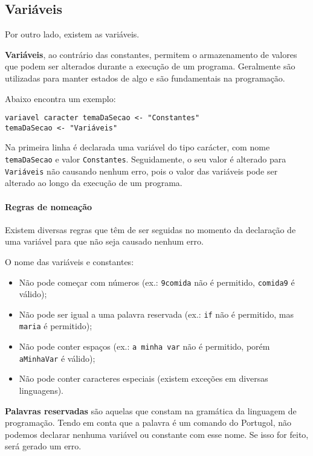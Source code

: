 \subsection{Variáveis}

Por outro lado, existem as variáveis.

\begin{defi}
\textbf{Variáveis}, ao contrário das constantes, permitem o armazenamento de valores que podem ser alterados durante a execução de um programa. Geralmente são utilizadas para manter estados de algo e são fundamentais na programação.
\end{defi}

Abaixo encontra um exemplo:

\begin{lstlisting}
variavel caracter temaDaSecao <- "Constantes"      
temaDaSecao <- "Variáveis"  
\end{lstlisting}

Na primeira linha é declarada uma variável do tipo carácter, com nome \texttt{temaDaSecao} e valor \texttt{Constantes}. Seguidamente, o seu valor é alterado para \texttt{Variáveis} não causando nenhum erro, pois o valor das variáveis pode ser alterado ao longo da execução de um programa.

\paragraph{Regras de nomeação}

Existem diversas regras que têm de ser seguidas no momento da declaração de uma variável para que não seja causado nenhum erro.

O nome das variáveis e constantes:

\begin{itemize}
  \item Não pode começar com números (ex.: \texttt{9comida} não é permitido, \texttt{comida9} é válido);
  \item Não pode ser igual a uma palavra reservada (ex.: \texttt{if} não é permitido, mas \texttt{maria} é permitido);
  \item Não pode conter espaços (ex.: \texttt{a minha var} não é permitido, porém \texttt{aMinhaVar} é válido);
  \item Não pode conter caracteres especiais (existem exceções em diversas linguagens).
\end{itemize}

\begin{defi}
\textbf{Palavras reservadas} são aquelas que constam na gramática da linguagem de programação. Tendo em conta que a palavra  é um comando do Portugol, não podemos declarar nenhuma variável ou constante com esse nome. Se isso for feito, será gerado um erro.
\end{defi}

